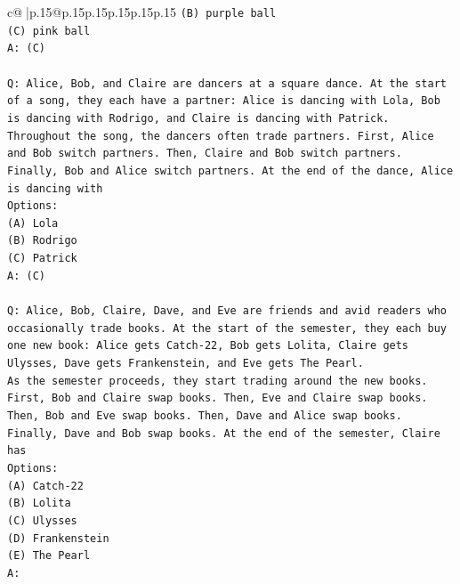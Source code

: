 \documentclass{article}
\begin{document}
{\begin{supertabular}{c@{$\;$}|p{.15\linewidth}@{}p{.15\linewidth}p{.15\linewidth}p{.15\linewidth}p{.15\linewidth}p{.15\linewidth}}
{{{\texttt{(B) purple ball} \\
\texttt{(C) pink ball} \\
\texttt{A: (C)} \\
\\ 
\texttt{Q: Alice, Bob, and Claire are dancers at a square dance. At the start of a song, they each have a partner: Alice is dancing with Lola, Bob is dancing with Rodrigo, and Claire is dancing with Patrick.} \\
\texttt{Throughout the song, the dancers often trade partners. First, Alice and Bob switch partners. Then, Claire and Bob switch partners. Finally, Bob and Alice switch partners. At the end of the dance, Alice is dancing with} \\
\texttt{Options:} \\
\texttt{(A) Lola} \\
\texttt{(B) Rodrigo} \\
\texttt{(C) Patrick} \\
\texttt{A: (C)} \\
\\ 
\texttt{Q: Alice, Bob, Claire, Dave, and Eve are friends and avid readers who occasionally trade books. At the start of the semester, they each buy one new book: Alice gets Catch{-}22, Bob gets Lolita, Claire gets Ulysses, Dave gets Frankenstein, and Eve gets The Pearl.} \\
\texttt{As the semester proceeds, they start trading around the new books. First, Bob and Claire swap books. Then, Eve and Claire swap books. Then, Bob and Eve swap books. Then, Dave and Alice swap books. Finally, Dave and Bob swap books. At the end of the semester, Claire has} \\
\texttt{Options:} \\
\texttt{(A) Catch{-}22} \\
\texttt{(B) Lolita} \\
\texttt{(C) Ulysses} \\
\texttt{(D) Frankenstein} \\
\texttt{(E) The Pearl} \\
\texttt{A:} \\
            }
        }
    }
     \\ \\


\end{supertabular}}
\end{document}
